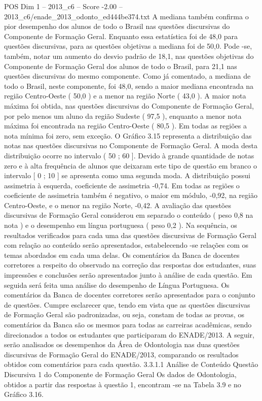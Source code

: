 \begin{textsample}{POS Dim 1 – 2013\_c6 – Score -2.00 – 2013\_c6/enade\_2013\_odonto\_ed444be374.txt}
A mediana também confirma o pior desempenho dos alunos de todo o Brasil nas questões discursivas do Componente de Formação Geral.
Enquanto essa estatística foi de 48,0 para questões discursivas, para as questões objetivas a mediana foi de 50,0.
Pode -se, também, notar um aumento do desvio padrão de 18,1, nas questões objetivas do Componente de Formação Geral dos alunos de todo o Brasil, para 21,1 nas questões discursivas do mesmo componente.
Como já comentado, a mediana de todo o Brasil, neste componente, foi 48,0, sendo a maior mediana encontrada na região Centro-Oeste ( 50,0 ) e a menor na região Norte ( 43,0 ).
A maior nota máxima foi obtida, nas questões discursivas do Componente de Formação Geral, por pelo menos um aluno da região Sudeste ( 97,5 ), enquanto a menor nota máxima foi encontrada na região Centro-Oeste ( 80,5 ).
Em todas as regiões a nota mínima foi zero, sem exceção.
O Gráfico 3.15 representa a distribuição das notas nas questões discursivas no Componente de Formação Geral.
A moda desta distribuição ocorre no intervalo ( 50 ; 60 ].
Devido à grande quantidade de notas zero e à alta frequência de alunos que deixaram este tipo de questão em branco o intervalo [ 0 ; 10 ] se apresenta como uma segunda moda.
A distribuição possui assimetria à esquerda, coeficiente de assimetria -0,74.
Em todas as regiões o coeficiente de assimetria também é negativo, o maior em módulo, -0,92, na região Centro-Oeste, e o menor na região Norte, -0,42.
A avaliação das questões discursivas de Formação Geral considerou em separado o conteúdo ( peso 0,8 na nota ) e o desempenho em língua portuguesa ( peso 0,2 ).
Na sequência, os resultados verificados para cada uma das questões discursivas de Formação Geral com relação ao conteúdo serão apresentados, estabelecendo -se relações com os temas abordados em cada uma delas.
Os comentários da Banca de docentes corretores a respeito do observado na correção das respostas dos estudantes, suas impressões e conclusões serão apresentados junto à análise de cada questão.
Em seguida será feita uma análise do desempenho de Língua Portuguesa.
Os comentários da Banca de docentes corretores serão apresentados para o conjunto de questões.
Cumpre esclarecer que, tendo em vista que as questões discursivas de Formação Geral são padronizadas, ou seja, constam de todas as provas, os comentários da Banca são os mesmos para todas as carreiras acadêmicas, sendo direcionados a todos os estudantes que participaram do ENADE/2013.
A seguir, serão analisados os desempenhos da Área de Odontologia nas duas questões discursivas de Formação Geral do ENADE/2013, comparando os resultados obtidos com comentários para cada questão. 3.3.1.1 Análise de Conteúdo Questão Discursiva 1 do Componente de Formação Geral Os dados de Odontologia, obtidos a partir das respostas à questão 1, encontram -se na Tabela 3.9 e no Gráfico 3.16.

\end{textsample}
